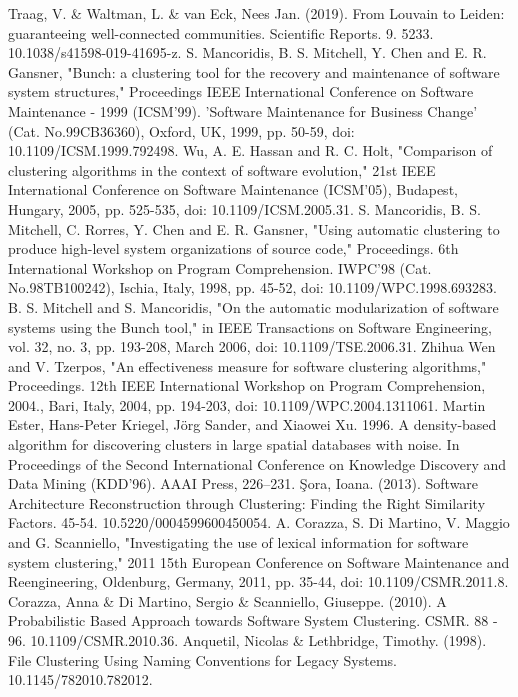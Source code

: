\documentclass{ieeeaccess}
\begin{document}
\begin{thebibliography}{00}
 Traag, V. \& Waltman, L. \& van Eck, Nees Jan. (2019). From Louvain to Leiden: guaranteeing well-connected communities. Scientific Reports. 9. 5233. 10.1038/s41598-019-41695-z. 
 S. Mancoridis, B. S. Mitchell, Y. Chen and E. R. Gansner, "Bunch: a clustering tool for the recovery and maintenance of software system structures," Proceedings IEEE International Conference on Software Maintenance - 1999 (ICSM'99). 'Software Maintenance for Business Change' (Cat. No.99CB36360), Oxford, UK, 1999, pp. 50-59, doi: 10.1109/ICSM.1999.792498.
 Wu, A. E. Hassan and R. C. Holt, "Comparison of clustering algorithms in the context of software evolution," 21st IEEE International Conference on Software Maintenance (ICSM'05), Budapest, Hungary, 2005, pp. 525-535, doi: 10.1109/ICSM.2005.31.
 S. Mancoridis, B. S. Mitchell, C. Rorres, Y. Chen and E. R. Gansner, "Using automatic clustering to produce high-level system organizations of source code," Proceedings. 6th International Workshop on Program Comprehension. IWPC'98 (Cat. No.98TB100242), Ischia, Italy, 1998, pp. 45-52, doi: 10.1109/WPC.1998.693283.
 B. S. Mitchell and S. Mancoridis, "On the automatic modularization of software systems using the Bunch tool," in IEEE Transactions on Software Engineering, vol. 32, no. 3, pp. 193-208, March 2006, doi: 10.1109/TSE.2006.31. 
 Zhihua Wen and V. Tzerpos, "An effectiveness measure for software clustering algorithms," Proceedings. 12th IEEE International Workshop on Program Comprehension, 2004., Bari, Italy, 2004, pp. 194-203, doi: 10.1109/WPC.2004.1311061.
 Martin Ester, Hans-Peter Kriegel, Jörg Sander, and Xiaowei Xu. 1996. A density-based algorithm for discovering clusters in large spatial databases with noise. In Proceedings of the Second International Conference on Knowledge Discovery and Data Mining (KDD'96). AAAI Press, 226–231.
 Şora, Ioana. (2013). Software Architecture Reconstruction through Clustering: Finding the Right Similarity Factors. 45-54. 10.5220/0004599600450054. 
 A. Corazza, S. Di Martino, V. Maggio and G. Scanniello, "Investigating the use of lexical information for software system clustering," 2011 15th European Conference on Software Maintenance and Reengineering, Oldenburg, Germany, 2011, pp. 35-44, doi: 10.1109/CSMR.2011.8.
 Corazza, Anna \& Di Martino, Sergio \& Scanniello, Giuseppe. (2010). A Probabilistic Based Approach towards Software System Clustering. CSMR. 88 - 96. 10.1109/CSMR.2010.36. 
 Anquetil, Nicolas \& Lethbridge, Timothy. (1998). File Clustering Using Naming Conventions for Legacy Systems. 10.1145/782010.782012. 

\end{thebibliography}
\end{document}
